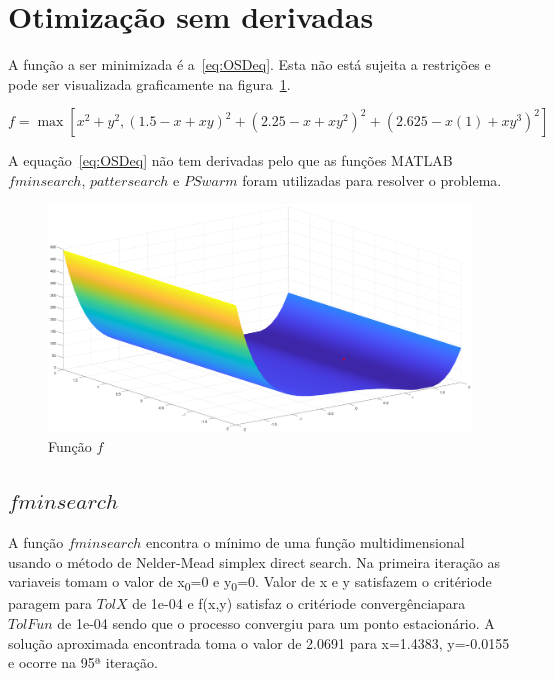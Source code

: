 \documentclass[a4paper,12pt]{article}
\begin{document}
\section{Otimização sem derivadas}

A função a ser minimizada é a~\ref{eq:OSDeq}. Esta não está sujeita a restrições e pode ser visualizada graficamente na figura~\ref{fig:funcf}.

\begin{equation}\label{eq:OSDeq}
f= \max[ x^2 + y^2, (1.5 - x + x y)^2 + (2.25 - x + x y^2)^2 + (2.625 - x(1) + x y^3)^2 ]
\end{equation}

A equação~\ref{eq:OSDeq} não tem derivadas pelo que as funções MATLAB $fminsearch$, $pattersearch$ e $PSwarm$ foram utilizadas para resolver o problema.

\begin{figure}[h]
\begin{center}
\includegraphics[scale=0.3]{OSD.eps}
\end{center}
\caption{Função $f$}
\label{fig:funcf}
\end{figure}


\subsection{$fminsearch$}

A função $fminsearch$ encontra  o  mínimo  de  uma  função  multidimensional  usando  o método  de Nelder-Mead simplex direct search. Na primeira iteração as variaveis tomam o valor de x\textsubscript{0}=0 e y\textsubscript{0}=0.
Valor de x e y satisfazem o critériode paragem para $TolX$ de 1e-04 e f(x,y) satisfaz o critériode convergênciapara $TolFun$  de 1e-04 sendo  que  o processo  convergiu para  um  ponto estacionário. A solução aproximada encontrada toma o valor de 2.0691 para x=1.4383, y=-0.0155 e ocorre na 95ª iteração. 
\end{document}
